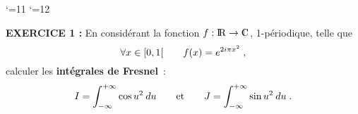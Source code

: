 \documentclass{article}
\begin{document}
\def\boxit#1#2{\setbox1=\hbox{\kern#1{#2}\kern#1}%
\dimen1=\ht1 \advance\dimen1 by #1 \dimen2=\dp1 \advance\dimen2 by #1
\setbox1=\hbox{\vrule height\dimen1 depth\dimen2\box1\vrule}%
\setbox1=\vbox{\hrule\box1\hrule}%
\advance\dimen1 by .4pt \ht1=\dimen1
\advance\dimen2 by .4pt \dp1=\dimen2 \box1\relax}


\catcode`\@=11
\def\system#1{\left\{\null\,\vcenter{\openup1\jot\m@th
\ialign{\strut\hfil$##$&$##$\hfil&&\enspace$##$\enspace&
\hfil$##$&$##$\hfil\crcr#1\crcr}}\right.}
\catcode`\@=12
\pagestyle{empty}
\def\lap#1{{\cal L}[#1]}
\def\DP#1#2{{\partial#1\s\partial#2}}
\def\cala{{\cal A}}
\def\fhat{\widehat{f}}
\let\wh=\widehat
\def\ftilde{\tilde{f}}











\def\lap#1{{\cal L}[#1]}
\def\DP#1#2{{\partial#1\s\partial#2}}



\overfullrule=0mm


\msk
{}
\bsk

{\bf EXERCICE 1 :}\msk
En consid\'erant la fonction $f:\rmat\vers\cmat$, 1-p\'eriodique, telle que\vv
$$\forall x\in[0,1[\qquad f(x)=e^{2i\pi x^2}\;,$$
calculer les {\bf int\'egrales de Fresnel}~:\vv
$$I=\int_{-\infty}^{+\infty}\cos u^2\>du\qquad{\rm et}\qquad
  J=\int_{-\infty}^{+\infty}\sin u^2\>du\;.$$

\msk
\cl{- - - - - - - - - - - - - - - - - - - - - - - - - - - - - - }
\msk
\end{document}
